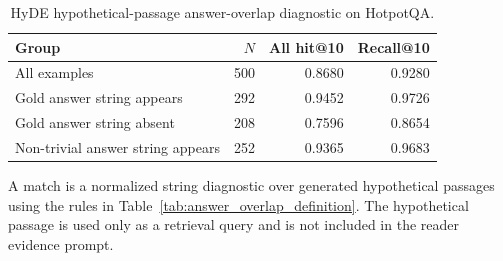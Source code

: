 \begin{table}[t]
\centering
\caption{HyDE hypothetical-passage answer-overlap diagnostic on HotpotQA.}
\label{tab:hyde_overlap_diagnostic}
\scriptsize
\setlength{\tabcolsep}{3pt}
\begin{tabularx}{\columnwidth}{>{\raggedright\arraybackslash}X r r r}
\toprule
Group & $N$ & All hit@10 & Recall@10 \\
\midrule
All examples & 500 & 0.8680 & 0.9280 \\
Gold answer string appears & 292 & 0.9452 & 0.9726 \\
Gold answer string absent & 208 & 0.7596 & 0.8654 \\
Non-trivial answer string appears & 252 & 0.9365 & 0.9683 \\
\bottomrule
\end{tabularx}
\begin{tablenotes}
\footnotesize
\item A match is a normalized string diagnostic over generated hypothetical passages using the rules in Table~\ref{tab:answer_overlap_definition}. The hypothetical passage is used only as a retrieval query and is not included in the reader evidence prompt.
\end{tablenotes}
\end{table}

